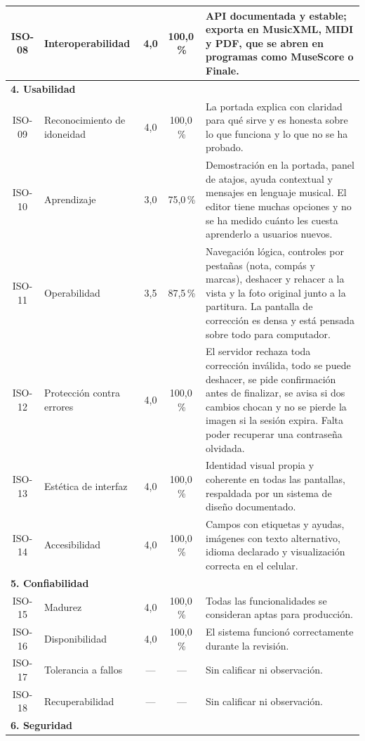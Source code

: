 \documentclass[conference]{IEEEtran}
\begin{document}
\begin{table}[htbp]
\begin{tabular}{|c|p{2.8cm}|c|c|p{9.9cm}|}
\hline
ISO-08 & Interoperabilidad & 4,0 & 100,0\,\% & API documentada y estable; exporta en MusicXML, MIDI y PDF, que se abren en programas como MuseScore o Finale. \\
\hline
\multicolumn{5}{|l|}{\textbf{4. Usabilidad}} \\
\hline
ISO-09 & Reconocimiento de idoneidad & 4,0 & 100,0\,\% & La portada explica con claridad para qué sirve y es honesta sobre lo que funciona y lo que no se ha probado. \\
\hline
ISO-10 & Aprendizaje & 3,0 & 75,0\,\% & Demostración en la portada, panel de atajos, ayuda contextual y mensajes en lenguaje musical. El editor tiene muchas opciones y no se ha medido cuánto les cuesta aprenderlo a usuarios nuevos. \\
\hline
ISO-11 & Operabilidad & 3,5 & 87,5\,\% & Navegación lógica, controles por pestañas (nota, compás y marcas), deshacer y rehacer a la vista y la foto original junto a la partitura. La pantalla de corrección es densa y está pensada sobre todo para computador. \\
\hline
ISO-12 & Protección contra errores & 4,0 & 100,0\,\% & El servidor rechaza toda corrección inválida, todo se puede deshacer, se pide confirmación antes de finalizar, se avisa si dos cambios chocan y no se pierde la imagen si la sesión expira. Falta poder recuperar una contraseña olvidada. \\
\hline
ISO-13 & Estética de interfaz & 4,0 & 100,0\,\% & Identidad visual propia y coherente en todas las pantallas, respaldada por un sistema de diseño documentado. \\
\hline
ISO-14 & Accesibilidad & 4,0 & 100,0\,\% & Campos con etiquetas y ayudas, imágenes con texto alternativo, idioma declarado y visualización correcta en el celular. \\
\hline
\multicolumn{5}{|l|}{\textbf{5. Confiabilidad}} \\
\hline
ISO-15 & Madurez & 4,0 & 100,0\,\% & Todas las funcionalidades se consideran aptas para producción. \\
\hline
ISO-16 & Disponibilidad & 4,0 & 100,0\,\% & El sistema funcionó correctamente durante la revisión. \\
\hline
ISO-17 & Tolerancia a fallos & --- & --- & Sin calificar ni observación. \\
\hline
ISO-18 & Recuperabilidad & --- & --- & Sin calificar ni observación. \\
\hline
\multicolumn{5}{|l|}{\textbf{6. Seguridad}} \\

\end{tabular}
\end{table}
\end{document}
